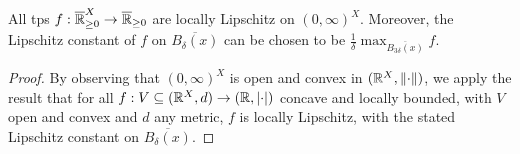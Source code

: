 \begin{theorem}\label{thmTLSlocLip}
All tps $f:\overline{\mathbb{R}}_{\geq 0}^X\to\overline{\mathbb{R}}_{\geq 0}$ are locally Lipschitz on $(0,\infty)^X$.
Moreover, the Lipschitz constant of $f$ on $\overline{B_{\delta}(x)}$ can be chosen to be $\frac{1}{\delta}\max_{\overline{B_{3\delta}(x)}} f$.
\end{theorem}
\begin{proof}
By observing that $(0,\infty)^X$ is open and convex in $(\mathbb{R}^X,\lVert\cdot\rVert)$, we apply the result that for all $f:V\subseteq (\mathbb{R}^X,d) \to (\mathbb{R},\left\lvert\cdot\right\rvert)$ concave and locally bounded, with $V$ open and convex and $d$ any metric, $f$ is locally Lipschitz, with the stated Lipschitz constant on $\overline{B_{\delta}(x)}$. %
\end{proof}

